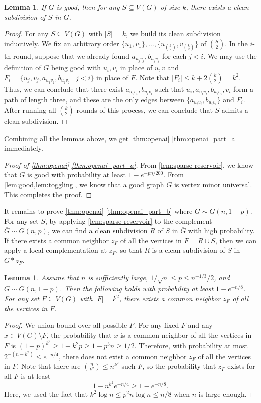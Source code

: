 \documentclass[reqno]{amsart}
\newtheorem{lemma}[theorem]{Lemma}
\theoremstyle{definition}
\numberwithin{theorem}{section}
\renewcommand{\leq}{\le}
\renewcommand{\geq}{\ge}
\renewcommand{\le}{\leqslant}
\renewcommand{\ge}{\geqslant}
\newcommand{\abs}[1]{\left|#1\right|}
\begin{document}
\begin{lemma}\label{lem:good}
    If $G$ is good, then for any $S\subseteq V(G)$ of size $k$, there exists a clean subdivision of $S$ in $G$.
\end{lemma}
\begin{proof}
    For any $S\subseteq V(G)$ with $\abs{S}=k$, we build its clean subdivision inductively. We fix an arbitrary order $\{u_1,v_1\},\dots,\{u_{\binom{k}{2}},v_{\binom{k}{2}}\}$ of $\binom{S}{2}$. In the $i$-th round, suppose that we already found $a_{u_jv_j},b_{u_jv_j}$ for each $j<i$. We may use the definition of $G$ being good with $u_i,v_i$ in place of $u,v$ and $F_i=\{u_j,v_j,a_{u_jv_j},b_{u_jv_j}\mid j<i\}$ in place of $F$. Note that $\abs{F_i}\leq k+2\binom{k}{2}=k^2$. Thus, we can conclude that there exist $a_{u_iv_i},b_{u_iv_i}$ such that $u_i,a_{u_iv_i},b_{u_iv_i},v_i$ form a path of length three, and these are the only edges between $\{a_{u_iv_i},b_{u_iv_i}\}$ and $F_i$. After running all $\binom{k}{2}$ rounds of this process, we can conclude that $S$ admits a clean subdivision.
\end{proof}

Combining all the lemmas above, we get \cref{thm:openai} \ref{thm:openai_part_a} immediately.
\begin{proof}[Proof of \cref{thm:openai} \ref{thm:openai_part_a}]
    From \cref{lem:sparse-reservoir}, we know that $G$ is good with probability at least $1-e^{-pn/200}$. From \cref{lem:good,lem:toggling}, we know that a good graph $G$ is vertex minor universal. This completes the proof.
\end{proof}

It remains to prove \cref{thm:openai} \ref{thm:openai_part_b} where $G\sim G(n,1-p)$. For any set $S$, by applying \cref{lem:sparse-reservoir} to the complement $\overline{G}\sim G(n,p)$, we can find a clean subdivision $R$ of $S$ in $\overline{G}$ with high probability. If there exists a common neighbor $z_F$ of all the vertices in $F=R\cup S$, then we can apply a local complementation at $z_F$, so that $R$ is a clean subdivision of $S$ in $G* z_F$.
\begin{lemma}\label{lem:common_neighbor}
Assume that $n$ is sufficiently large, $1/\sqrt{n}\leq p\leq n^{-1/3}/2$, and $G\sim G(n,1-p)$.
Then the following holds with probability at least $1-e^{-n/8}$. For any set $F\subseteq V(G)$ with $\abs{F}=k^2$, there exists a common neighbor $z_F$ of all the vertices in $F$.
\end{lemma}
\begin{proof}
    We union bound over all possible $F$. For any fixed $F$ and any $x\in V(G)\setminus F$, the probability that $x$ is a common neighbor of all the vertices in $F$ is $(1-p)^{k^2}\geq 1-k^2p\geq 1-p^3n\geq 1/2$. Therefore, with probability at most $2^{-(n-k^2)}\leq e^{-n/4}$, there does not exist a common neighbor $z_F$ of all the vertices in $F$. Note that there are $\binom{n}{k^2}\leq n^{k^2}$ such $F$, so the probability that $z_F$ exists for all $F$ is at least
    \[1-n^{k^2}e^{-n/4}\geq 1-e^{-n/8}.\]
    Here, we used the fact that $k^2\log n\leq p^2n\log n\leq n/8$ when $n$ is large enough.
\end{proof}
\end{document}
